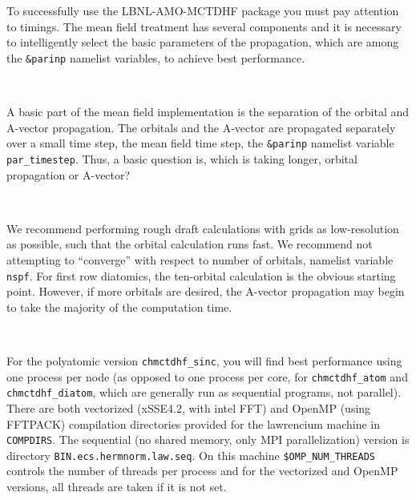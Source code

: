 \documentclass[10pt,leqno, oneside]{book}
\begin{document}

To successfully use the LBNL-AMO-MCTDHF package you must pay attention to timings.  The mean field treatment has
several components and it is necessary to intelligently select the basic parameters of the propagation, which are among
the \verb#&parinp# namelist variables, to achieve best performance.

\

A basic part of the mean field implementation is the separation of the orbital and A-vector propagation.  The orbitals
and the A-vector are propagated separately over a small time step, the mean field time step, the \verb#&parinp# namelist
variable \verb#par_timestep#.  Thus, a basic question is, which is taking longer, orbital propagation or A-vector?

\

We recommend performing rough draft calculations with grids as low-resolution as possible, such that the orbital calculation
runs fast.  We recommend not attempting to ``converge'' with respect to number of orbitals, namelist variable \verb#nspf#.
For first row diatomics, the ten-orbital calculation is the obvious starting point.  However, if more orbitals are desired, the
A-vector propagation may begin to take the majority of the computation time.

\

For the polyatomic version \verb#chmctdhf_sinc#, you will find best performance using one process per node (as opposed to
one process per core, for \verb#chmctdhf_atom# and \verb#chmctdhf_diatom#, which are generally run as sequential programs,
not parallel).  There are both vectorized (xSSE4.2, with intel FFT) and OpenMP (using FFTPACK) 
compilation directories provided for the lawrencium machine in \verb#COMPDIRS#.  The sequential (no shared memory, only
MPI parallelization) version is directory \verb#BIN.ecs.hermnorm.law.seq#.  On this machine \verb#$OMP_NUM_THREADS# controls
the number of threads per process and for the vectorized and OpenMP versions, all threads are taken if it is not set.
\end{document}
